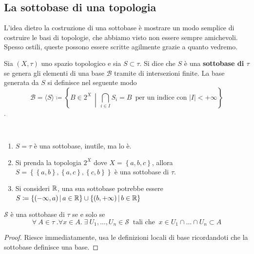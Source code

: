 \newpage
\subsection{\textcolor{TopGener}{\textbf{La sottobase di una topologia}}}



L'idea dietro la costruzione di una sottobase è mostrare un modo semplice di costruire le basi di topologie, che abbiamo visto non essere sempre amichevoli. Spesso ostili, queste possono essere scritte agilmente grazie a quanto vedremo.

\begin{definition}
	Sia $(X,\tau)$ uno spazio topologico e sia $S \subset \tau$. Si dice che $S$ è una \textbf{sottobase di $\tau$} se genera gli elementi di una base $\mathcal{B}$ tramite di intersezioni finite. La base generata da $S$ si definisce nel seguente modo 
	\begin{equation*}
		 \mathcal{B} = \langle S\rangle \coloneqq \left\{ B \in 2^X \,\middle|\, \bigcap_{i \in I} S_i = B \, \text{ per un indice con } |I| < +\infty \right\}
	\end{equation*}
	.
\end{definition}

\begin{example}\
\begin{enumerate}
	\item $S = \tau$ è una sottobase, inutile, ma lo è.
	\item Si prenda la topologia $2^X$ dove $X = \left\{a,b,c\right\}$, allora $S = \left\{\left\{a,b\right\},\left\{a,c\right\},\left\{c,b\right\}\right\}$ è una sottobase di $\tau$.
	\item Si consideri $\mathbb{R}$, una sua sottobase potrebbe essere $S \coloneqq \left\{(-\infty, a) \,\middle|\, a \in \mathbb{R}\right\} \cup \left\{(b, +\infty) \,\middle|\, b \in \mathbb{R}\right\}$
\end{enumerate}
\end{example}

\begin{proposition}
	$\mathcal{S}$ è una sottobase di $\tau$ se e solo se
	\begin{equation*}
	\forall \ A \in \tau \; . \forall x \in A . \; \exists \ U_1, \dots, U_n \in \mathcal{S} \ \text{ tali che } \ x \in U_1 \cap \dots \cap U_n \subset A
	\end{equation*}
\end{proposition}
\begin{proof}
	Riesce immediatamente, usa le definizioni locali di base ricordandoti che la sottobase definisce una base.
\end{proof}

